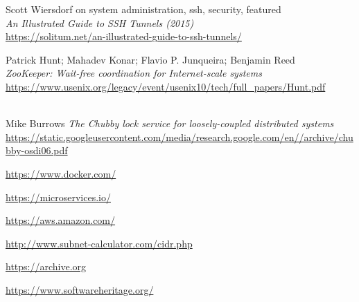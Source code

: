 \begin{thebibliography}{9}
  Scott Wiersdorf on system administration, ssh, security, featured \\
  \textit{An Illustrated Guide to SSH Tunnels (2015)} \\
  \url{https://solitum.net/an-illustrated-guide-to-ssh-tunnels/}

  Patrick Hunt; Mahadev Konar; Flavio P. Junqueira; Benjamin Reed \\
  \textit{ZooKeeper: Wait-free coordination for Internet-scale systems} \\
  \url{https://www.usenix.org/legacy/event/usenix10/tech/full_papers/Hunt.pdf}

  \\Mike Burrows
  \textit{The Chubby lock service for loosely-coupled distributed systems} \\
  \url{https://static.googleusercontent.com/media/research.google.com/en//archive/chubby-osdi06.pdf}

\url{https://www.docker.com/}

\url{https://microservices.io/}

\url{https://aws.amazon.com/}

\url{http://www.subnet-calculator.com/cidr.php}

\url{https://archive.org}

\url{https://www.softwareheritage.org/}
\end{thebibliography}